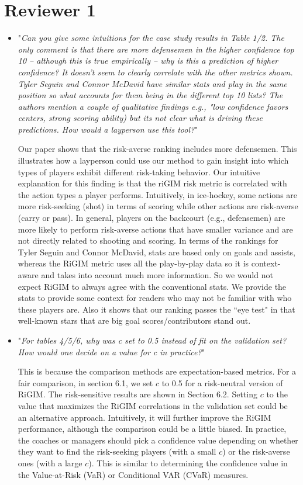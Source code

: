 \documentclass{article}
\begin{document}
\section{Reviewer 1}

\begin{itemize}
    \item "{\it Can you give some intuitions for the case study results in Table 1/2. The only comment is that there are more defensemen in the higher confidence top 10 -- although this is true empirically -- why is this a prediction of higher confidence? It doesn't seem to clearly correlate with the other metrics shown. Tyler Seguin and Connor McDavid have similar stats and play in the same position so what accounts for them being in the different top 10 lists? The authors mention a couple of qualitative findings e.g., "low confidence favors centers, strong scoring ability) but its not clear what is driving these predictions. How would a layperson use this tool?}"
    
    Our paper shows that the risk-averse ranking includes more defensemen. This illustrates how a layperson could use our method to gain insight into which types of players exhibit different risk-taking behavior. Our intuitive explanation for this finding is that the riGIM risk metric is correlated with the action types a player performs. Intuitively, in ice-hockey, some actions are more risk-seeking (shot) in terms of scoring while other actions are risk-averse (carry or pass). In general, players on the backcourt (e.g., defensemen) are more likely to perform risk-averse actions that have smaller variance and are not directly related to shooting and scoring.
    In terms of the rankings for Tyler Seguin and Connor McDavid, stats are based only on goals and assists, whereas the RiGIM metric uses all the play-by-play data so it is context-aware and 
    takes into account much more information. So we would not expect RiGIM to always agree with the conventional stats. We provide the stats to provide some context for readers who may not be familiar with who these players are. Also it shows that our ranking passes the ``eye test" in that well-known stars that are big goal scores/contributors stand out.

    \item "{\it For tables 4/5/6, why was c set to 0.5 instead of fit on the validation set? How would one decide on a value for c in practice?}"
    
    This is because the comparison methods are expectation-based metrics. For a fair comparison, in section 6.1, we set $c$ to 0.5 for a risk-neutral version of RiGIM. The risk-sensitive results are shown in Section 6.2. Setting $c$ to the value that maximizes the RiGIM correlations in the validation set could be an alternative approach. Intuitively, it will further improve the RiGIM performance, although the comparison could be a little biased. In practice, the coaches or managers should pick a confidence value depending on whether they want to find the risk-seeking players (with a small $c$) or the risk-averse ones (with a large $c$). This is similar to determining the confidence value in the Value-at-Risk (VaR) or Conditional VAR (CVaR) measures.


\end{itemize}
\end{document}
